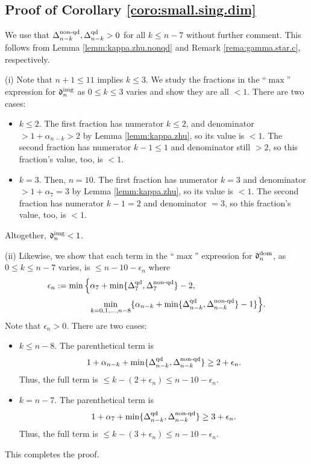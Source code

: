 \documentclass[11pt, letterpaper, reqno]{amsart}
\numberwithin{equation}{section}
\theoremstyle{remark}
\begin{document}
\subsection{Proof of Corollary \ref{coro:small.sing.dim}}

	We use that $\Delta^{\textnormal{non-qd}}_{n-k}, \Delta^{\textnormal{qd}}_{n-k} > 0$ for all $k \leq n-7$ without further comment. This follows from Lemma \ref{lemm:kappa.zhu.nonqd} and Remark \ref{rema:gamma.star.c}, respectively.
	
	(i) Note that $n+1 \leq 11$ implies $k \leq 3$. We study the fractions in the ``$\max$'' expression for $\mathfrak{d}_{n}^{\textnormal{img}}$ as $0 \leq k \leq 3$ varies and show they are all $< 1$. There are two cases:
	\begin{itemize}
		\item $k \leq 2$. The first fraction has numerator $k \leq 2$, and denominator $> 1 + \alpha_{n-k} > 2$ by Lemma \ref{lemm:kappa.zhu}, so its value is $< 1$. The second fraction has numerator $k-1 \leq 1$ and denominator still $> 2$, so this fraction's value, too, is $< 1$.
		\item $k = 3$. Then, $n=10$. The first fraction has numerator $k = 3$ and denominator $> 1 + \alpha_7 = 3$ by Lemma \ref{lemm:kappa.zhu}, so its value is $< 1$. The second fraction has numerator $k-1 = 2$ and denominator $= 3$, so this fraction's value, too, is $< 1$.
	\end{itemize}
	Altogether, $\mathfrak{d}_{n}^{\textnormal{img}} < 1$.
	
	(ii) Likewise, we show that each term in the ``$\max$'' expression for $\mathfrak{d}_{n}^{\textnormal{dom}}$, as $0 \leq k \leq n-7$ varies,  is $\leq n-10-\epsilon_n$ where 
	\begin{align*}
		\epsilon_n 
			& := \min \Big\{ \alpha_7 + \min \{ \Delta^{\textnormal{qd}}_7, \Delta^{\textnormal{non-qd}}_7 \} - 2, \\
			& \qquad \qquad \min_{k=0,1,\ldots,n-8} \{ \alpha_{n-k} +  \min \{ \Delta^{\textnormal{qd}}_{n-k}, \Delta^{\textnormal{non-qd}}_{n-k} \} - 1 \} \Big\}.
	\end{align*}
	Note that $\epsilon_n > 0$. There are two cases:
	\begin{itemize}
		\item $k \leq n-8$. The parenthetical term is
			\[ 1 + \alpha_{n-k} + \min \{ \Delta^{\textnormal{qd}}_{n-k}, \Delta^{\textnormal{non-qd}}_{n-k} \} \geq 2 + \epsilon_n.  \]
			Thus, the full term is $\leq k - (2 + \epsilon_n) \leq n-10 - \epsilon_n$.
		\item $k = n-7$. The parenthetical term is
			\[ 1 + \alpha_7 + \min \{ \Delta^{\textnormal{qd}}_{n-k}, \Delta^{\textnormal{non-qd}}_{n-k} \} \geq 3 + \epsilon_n. \]
			Thus, the full term is $\leq k - (3 + \epsilon_n) \leq n - 10 - \epsilon_n$.
	\end{itemize}
This completes the proof.
\end{document}
